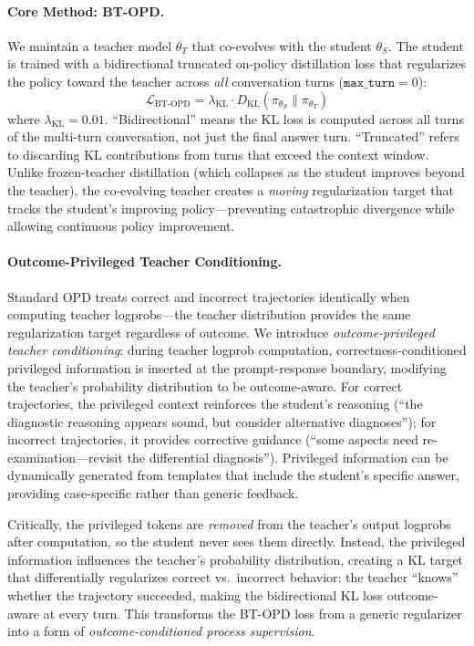 \documentclass{article}
\begin{document}
\paragraph{Core Method: BT-OPD.}
We maintain a teacher model $\theta_T$ that co-evolves with the student $\theta_S$. The student is trained with a bidirectional truncated on-policy distillation loss that regularizes the policy toward the teacher across \emph{all} conversation turns ($\texttt{max\_turn}=0$):
\begin{equation}
    \mathcal{L}_{\text{BT-OPD}} = \lambda_{\text{KL}} \cdot D_\text{KL}(\pi_{\theta_S} \| \pi_{\theta_T})
\end{equation}
where $\lambda_{\text{KL}} = 0.01$. ``Bidirectional'' means the KL loss is computed across all turns of the multi-turn conversation, not just the final answer turn. ``Truncated'' refers to discarding KL contributions from turns that exceed the context window. Unlike frozen-teacher distillation (which collapses as the student improves beyond the teacher), the co-evolving teacher creates a \emph{moving} regularization target that tracks the student's improving policy---preventing catastrophic divergence while allowing continuous policy improvement.

\paragraph{Outcome-Privileged Teacher Conditioning.}
Standard OPD treats correct and incorrect trajectories identically when computing teacher logprobs---the teacher distribution provides the same regularization target regardless of outcome. We introduce \emph{outcome-privileged teacher conditioning}: during teacher logprob computation, correctness-conditioned privileged information is inserted at the prompt-response boundary, modifying the teacher's probability distribution to be outcome-aware. For correct trajectories, the privileged context reinforces the student's reasoning (``the diagnostic reasoning appears sound, but consider alternative diagnoses''); for incorrect trajectories, it provides corrective guidance (``some aspects need re-examination---revisit the differential diagnosis''). Privileged information can be dynamically generated from templates that include the student's specific answer, providing case-specific rather than generic feedback.

Critically, the privileged tokens are \emph{removed} from the teacher's output logprobs after computation, so the student never sees them directly. Instead, the privileged information influences the teacher's probability distribution, creating a KL target that differentially regularizes correct vs.\ incorrect behavior: the teacher ``knows'' whether the trajectory succeeded, making the bidirectional KL loss outcome-aware at every turn. This transforms the BT-OPD loss from a generic regularizer into a form of \emph{outcome-conditioned process supervision}.
\end{document}
